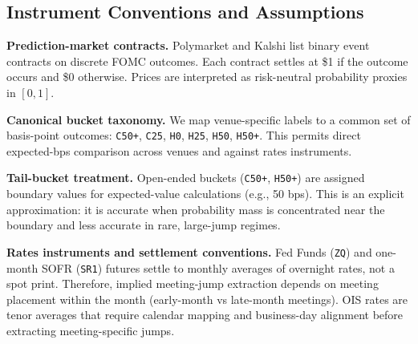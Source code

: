 
 

\subsection{Instrument Conventions and Assumptions}
\label{app:instrument_conventions}

\textbf{Prediction-market contracts.}
Polymarket and Kalshi list binary event contracts on discrete FOMC outcomes.
Each contract settles at \$1 if the outcome occurs and \$0 otherwise.
Prices are interpreted as risk-neutral probability proxies in $[0,1]$.

\textbf{Canonical bucket taxonomy.}
We map venue-specific labels to a common set of basis-point outcomes:
\texttt{C50+}, \texttt{C25}, \texttt{H0}, \texttt{H25}, \texttt{H50}, \texttt{H50+}.
This permits direct expected-bps comparison across venues and against rates instruments.

\textbf{Tail-bucket treatment.}
Open-ended buckets (\texttt{C50+}, \texttt{H50+}) are assigned boundary values
for expected-value calculations (e.g., 50 bps). This is an explicit approximation:
it is accurate when probability mass is concentrated near the boundary and less
accurate in rare, large-jump regimes.

\textbf{Rates instruments and settlement conventions.}
Fed Funds (\texttt{ZQ}) and one-month SOFR (\texttt{SR1}) futures settle to
monthly averages of overnight rates, not a spot print. Therefore, implied
meeting-jump extraction depends on meeting placement within the month
(early-month vs late-month meetings). OIS rates are tenor averages that require
calendar mapping and business-day alignment before extracting meeting-specific
jumps.

